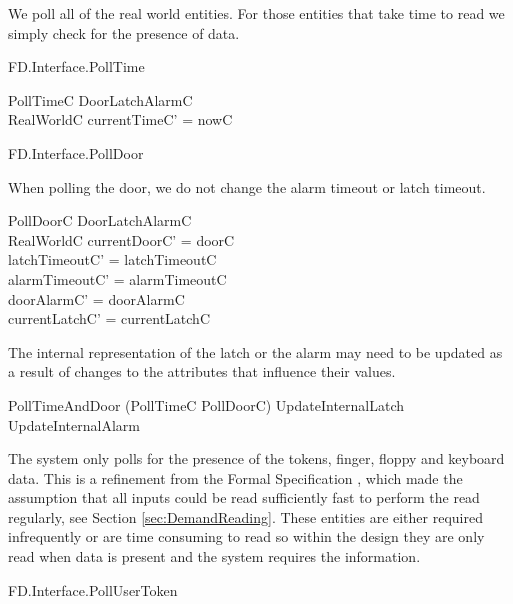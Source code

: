 We poll all of the real world entities. For those entities that take
time to read we simply check for the presence of data. 

\begin{traceunit}{FD.Interface.PollTime}
\end{traceunit}

\begin{schema}{PollTimeC}
	\Delta DoorLatchAlarmC
\\       RealWorldC
\where
	currentTimeC' = nowC
\end{schema}

\begin{traceunit}{FD.Interface.PollDoor}
\end{traceunit}

When polling the door, we do not change the alarm timeout or latch
timeout. 

\begin{schema}{PollDoorC}
	\Delta DoorLatchAlarmC
\\	RealWorldC
\where
	currentDoorC' = doorC
\\	latchTimeoutC' = latchTimeoutC
\\	alarmTimeoutC' = alarmTimeoutC
\\      doorAlarmC' = doorAlarmC
\\      currentLatchC' = currentLatchC
\end{schema}

The internal representation of the latch or the alarm may need to be
updated as a result of changes to the attributes that influence their
values. 

\begin{zed}
        PollTimeAndDoor  (PollTimeC \land PollDoorC) 
       \semi UpdateInternalLatch \semi UpdateInternalAlarm
\end{zed}

The system only polls for the presence of the tokens, finger, floppy and
keyboard data. This is a
refinement from the Formal Specification \cite{FS}, which made the
assumption that all inputs could be read sufficiently fast to perform
the read regularly, see Section \ref{sec:DemandReading}. These entities are either required
infrequently or are time consuming to read so within the design they are only read when
data is present and the system requires the information.

\begin{traceunit}{FD.Interface.PollUserToken}
\end{traceunit}

